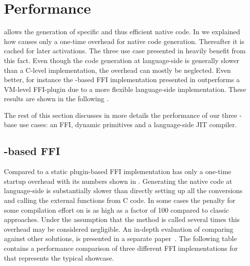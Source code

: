 \section{Performance}
\B allows the generation of specific and thus efficient native code.
In  we explained how \B causes only a one-time overhead for native code generation. 
Thereafter it is cached for later activations.
The three use case presented in  heavily benefit from this fact.
Even though the code generation at language-side is generally slower than a C-level implementation, the overhead can mostly be neglected.
Even better, for instance the \B-based FFI implementation presented in  outperforms a VM-level FFI-plugin due to a more flexible language-side implementation. 
These results are shown in the following .

The rest of this section discusses in more details the performance of our three \B-base use cases: an FFI, dynamic primitives and a language-side JIT compiler.

\subsection{\B-based FFI}

Compared to a static plugin-based FFI implementation \NB has only a one-time startup overhead with its numbers shown in .
Generating the native code at language-side is substantially slower than directly setting up all the conversions and calling the external functions from C code. 
In some cases the penalty for some compilation effort on \NB is as high as a factor of 100 compared to classic approaches.
Under the assumption that the method is called several times this overhead may be considered negligible.
An in-depth evaluation of \NB comparing against other solutions, is presented in a separate paper~\cite{Brun13a}.
The following table contains a performance comparison of three different FFI implementations for \PH that represents the typical showcase.

